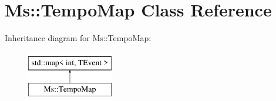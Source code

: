 \hypertarget{class_ms_1_1_tempo_map}{}\section{Ms\+:\+:Tempo\+Map Class Reference}
\label{class_ms_1_1_tempo_map}
Inheritance diagram for Ms\+:\+:Tempo\+Map\+:\begin{figure}[H]
\begin{center}
\leavevmode
\includegraphics[height=2.000000cm]{class_ms_1_1_tempo_map}
\end{center}
\end{figure}
